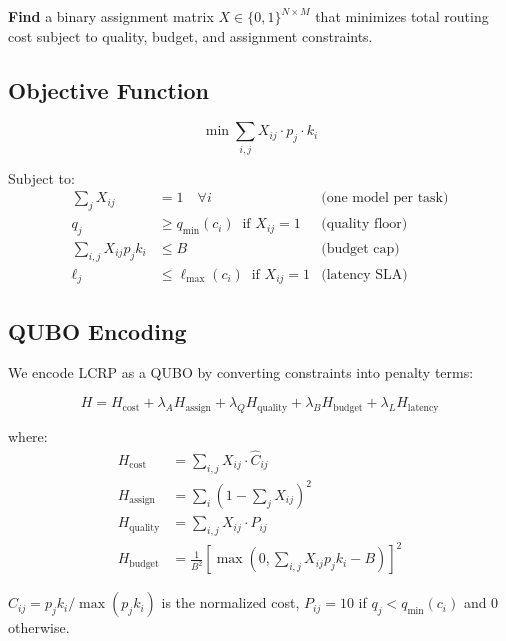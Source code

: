 \documentclass[conference]{IEEEtran}
\begin{document}
\textbf{Find} a binary assignment matrix $X \in \{0,1\}^{N \times M}$ that minimizes total routing cost subject to quality, budget, and assignment constraints.

\subsection{Objective Function}

\begin{equation}
\min \sum_{i,j} X_{ij} \cdot p_j \cdot k_i \label{eq:objective}
\end{equation}

Subject to:
\begin{align}
\sum_j X_{ij} &= 1 \quad \forall i & \text{(one model per task)} \label{eq:onehot}\\
q_j &\geq q_{\min}(c_i) \;\; \text{if } X_{ij}=1 & \text{(quality floor)} \label{eq:quality}\\
\sum_{i,j} X_{ij} p_j k_i &\leq B & \text{(budget cap)} \label{eq:budget}\\
\ell_j &\leq \ell_{\max}(c_i) \;\; \text{if } X_{ij}=1 & \text{(latency SLA)} \label{eq:latency}
\end{align}

\subsection{QUBO Encoding}

We encode LCRP as a QUBO by converting constraints into penalty terms:

\begin{equation}
H = H_{\text{cost}} + \lambda_A H_{\text{assign}} + \lambda_Q H_{\text{quality}} + \lambda_B H_{\text{budget}} + \lambda_L H_{\text{latency}}
\end{equation}

where:
\begin{align}
H_{\text{cost}} &= \sum_{i,j} X_{ij} \cdot \hat{C}_{ij} \\
H_{\text{assign}} &= \sum_i \left(1 - \sum_j X_{ij}\right)^2 \\
H_{\text{quality}} &= \sum_{i,j} X_{ij} \cdot P_{ij} \\
H_{\text{budget}} &= \frac{1}{B^2}\left[\max\left(0, \sum_{i,j} X_{ij} p_j k_i - B\right)\right]^2
\end{align}

$\hat{C}_{ij} = p_j k_i / \max(p_j k_i)$ is the normalized cost, $P_{ij} = 10$ if $q_j < q_{\min}(c_i)$ and 0 otherwise.
\end{document}
